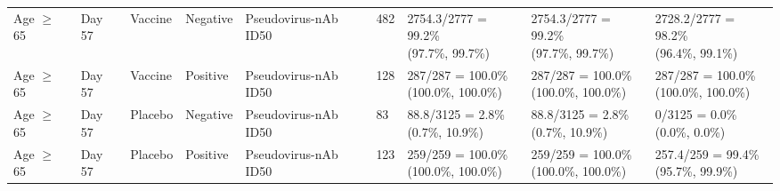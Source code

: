 \documentclass[]{book}
\theoremstyle{definition}
\theoremstyle{definition}
\theoremstyle{definition}
\newcommand{\1}{\mathbbm{1}}
\begin{document}
\begin{landscape}
\begin{ThreePartTable}
\begin{longtable}[t]{>{\raggedright\arraybackslash}p{2.7cm}llllllll}
\hspace{1em}Age $\geq$ 65 & Day 57 & Vaccine & Negative & Pseudovirus-nAb ID50 & 482 & \makecell[l]{2754.3/2777 = 99.2\%\\(97.7\%, 99.7\%)} & \makecell[l]{2754.3/2777 = 99.2\%\\(97.7\%, 99.7\%)} & \makecell[l]{2728.2/2777 = 98.2\%\\(96.4\%, 99.1\%)}\\
\hspace{1em}Age $\geq$ 65 & Day 57 & Vaccine & Positive & Pseudovirus-nAb ID50 & 128 & \makecell[l]{287/287 = 100.0\%\\(100.0\%, 100.0\%)} & \makecell[l]{287/287 = 100.0\%\\(100.0\%, 100.0\%)} & \makecell[l]{287/287 = 100.0\%\\(100.0\%, 100.0\%)}\\
\hspace{1em}Age $\geq$ 65 & Day 57 & Placebo & Negative & Pseudovirus-nAb ID50 & 83 & \makecell[l]{88.8/3125 = 2.8\%\\(0.7\%, 10.9\%)} & \makecell[l]{88.8/3125 = 2.8\%\\(0.7\%, 10.9\%)} & \makecell[l]{0/3125 = 0.0\%\\(0.0\%, 0.0\%)}\\
\hspace{1em}Age $\geq$ 65 & Day 57 & Placebo & Positive & Pseudovirus-nAb ID50 & 123 & \makecell[l]{259/259 = 100.0\%\\(100.0\%, 100.0\%)} & \makecell[l]{259/259 = 100.0\%\\(100.0\%, 100.0\%)} & \makecell[l]{257.4/259 = 99.4\%\\(95.7\%, 99.9\%)}\\*
\end{longtable}
\end{ThreePartTable}


\clearpage


\end{landscape}
\end{document}
